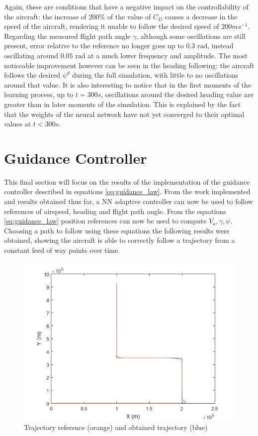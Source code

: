 Again, these are conditions that have a negative impact on the controllability of the aircraft: the increase of 200\% of the value of $C_D$ causes a decrease in the speed of the aircraft, rendering it unable to follow the desired speed of $200ms^{-1}$. Regarding the measured flight path angle $\gamma$, although  some oscillations are still present, error relative to the reference no longer goes up to $0.3\text{ rad}$, instead oscillating around $0.05\text{ rad}$ at a much lower frequency and amplitude. The most noticeable improvement however can be seen in the heading following: the aircraft follows the desired $\psi^d$ during the full simulation, with little to no oscillations around that value. It is also interesting to notice that in the first moments of the learning process, up to $t=300s$, oscillations around the desired heading value are greater than in later moments of the simulation. This is explained by the fact that the weights of the neural network have not yet converged to their optimal values at $t<300s$.


\section{Guidance Controller}
\label{section:results/guidance_control}

This final section will focus on the results of the implementation of the guidance controller described in equations \ref{eq:guidance_law}. From the work implemented and results obtained thus far, a NN adaptive controller can now be used to follow references of airspeed, heading and flight path angle. From the equations \ref{eq:guidance_law} position references can now be used to compute $V_a,\gamma, \psi$. Choosing a path to follow using these equations the following results were obtained, showing the aircraft is able to correctly follow a trajectory from a constant feed of way points over time.

\begin{figure}[h]
\centering
\includegraphics[width=1\textwidth]{Figures/Results/guidance.png}
\caption[Trajectory following with guidance controller]{Trajectory reference (orange) and obtained trajectory (blue)}
\label{fig:guidance}
\end{figure}



